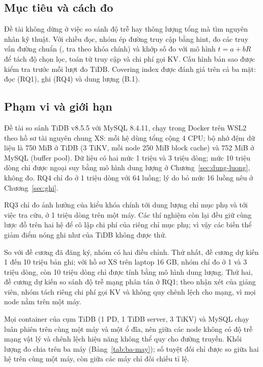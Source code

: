 \subsection{Mục tiêu và cách đo}
Đề tài không dừng ở việc so sánh độ trễ hay thông lượng tổng mà tìm nguyên nhân kỹ thuật. Với chiều đọc, nhóm ép đường truy cập bằng hint, đo các truy vấn đường chuẩn (, tra theo khóa chính) và khớp số đo với mô hình $t = a + bR$ để tách độ chọn lọc, toán tử truy cập và chi phí gọi KV. Cấu hình bản sao được kiểm tra trước mỗi lượt đo TiDB. Covering index được đánh giá trên cả ba mặt: đọc (RQ1), ghi (RQ4) và dung lượng (B.1).

\subsection{Phạm vi và giới hạn}
Đề tài so sánh TiDB v8.5.5 với MySQL 8.4.11, chạy trong Docker trên WSL2 theo hồ sơ tài nguyên chung XS: mỗi hệ dùng tổng cộng 4 CPU; bộ nhớ đệm dữ liệu là 750 MiB ở TiDB (3 TiKV, mỗi node 250 MiB block cache) và 752 MiB ở MySQL (buffer pool). Dữ liệu có hai mức 1 triệu và 3 triệu dòng; mức 10 triệu dòng chỉ được ngoại suy bằng mô hình dung lượng ở Chương~\ref{sec:dung-luong}, không đo. RQ4 chỉ đo ở 1 triệu dòng với 64 luồng; lý do bỏ mức 16 luồng nêu ở Chương~\ref{sec:ghi}.

RQ3 chỉ đo ảnh hưởng của kiểu khóa chính tới dung lượng chỉ mục phụ và tới việc tra cứu, ở 1 triệu dòng trên một máy. Các thí nghiệm còn lại đều giữ cùng lược đồ  trên hai hệ để cô lập chi phí của riêng chỉ mục phụ; vì vậy các biến thể giảm điểm nóng ghi như  của TiDB không được thử.

So với đề cương đã đăng ký, nhóm có hai điều chỉnh. Thứ nhất, đề cương dự kiến 1 đến 10 triệu bản ghi; với hồ sơ XS trên laptop 16 GB, nhóm chỉ đo ở 1 và 3 triệu dòng, còn 10 triệu dòng chỉ được tính bằng mô hình dung lượng. Thứ hai, đề cương dự kiến so sánh độ trễ mạng phân tán ở RQ1; theo nhận xét của giảng viên, nhóm tách riêng chi phí gọi KV và không quy chênh lệch cho mạng, vì mọi node nằm trên một máy.

Mọi container của cụm TiDB (1 PD, 1 TiDB server, 3 TiKV) và MySQL chạy luân phiên trên cùng một máy và một ổ đĩa, nên giữa các node không có độ trễ mạng vật lý và chênh lệch hiệu năng không thể quy cho đường truyền. Khối lượng đo chia trên ba máy (Bảng~\ref{tab:ba-may}); số tuyệt đối chỉ được so giữa hai hệ trên cùng một máy, còn giữa các máy chỉ đối chiếu tỉ lệ.

